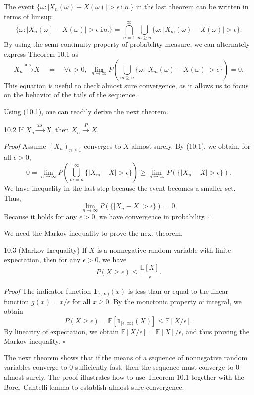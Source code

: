 The event $\{\omega:\lvert X_n(\omega)-X(\omega)\rvert>\epsilon\ \mathrm{i.o.}\}$ in the last theorem can be written in terms of limsup:
\[
\{\omega:\lvert X_n(\omega)-X(\omega)\rvert>\epsilon\ \mathrm{i.o.}\}
=
\bigcap_{n=1}^{\infty}\bigcup_{m\geq n}
\{\omega:\lvert X_m(\omega)-X(\omega)\rvert>\epsilon\}.
\]
By using the semi-continuity property of probability measure, we can alternately express Theorem 10.1 as
\[
X_n\xrightarrow{\mathrm{a.s.}}X
\quad\Longleftrightarrow\quad
\forall \epsilon>0,\;
\lim_{n\to\infty}P\left(
\bigcup_{m\geq n}
\{\omega:\lvert X_m(\omega)-X(\omega)\rvert>\epsilon\}
\right)=0.
\tag{10.1}
\]
This equation is useful to check almost sure convergence, as it allows us to focus on the behavior of the tails of the sequence.

Using (10.1), one can readily derive the next theorem.

\begin{thmbox}{10.2}
If $X_n\xrightarrow{\mathrm{a.s.}}X$, then $X_n\xrightarrow{P}X$.
\end{thmbox}

\textit{Proof}
Assume $(X_n)_{n\geq 1}$ converges to $X$ almost surely. By (10.1), we obtain, for all $\epsilon>0$,
\[
0=\lim_{n\to\infty}P\left(\bigcup_{m=n}^{\infty}\{\lvert X_m-X\rvert>\epsilon\}\right)
\geq
\lim_{n\to\infty}P(\{\lvert X_n-X\rvert>\epsilon\}).
\]
We have inequality in the last step because the event becomes a smaller set. Thus,
\[
\lim_{n\to\infty}P(\{\lvert X_n-X\rvert>\epsilon\})=0.
\]
Because it holds for any $\epsilon>0$, we have convergence in probability.
\hfill $\square$

We need the Markov inequality to prove the next theorem.

\begin{thmbox}{10.3 (Markov Inequality)}
If $X$ is a nonnegative random variable with finite expectation, then for any $\epsilon>0$, we have
\[
P(X\geq \epsilon)\leq \frac{\mathbb{E}[X]}{\epsilon}.
\]
\end{thmbox}

\textit{Proof}
The indicator function $\mathbf{1}_{[\epsilon,\infty)}(x)$ is less than or equal to the linear function $g(x)=x/\epsilon$ for all $x\geq 0$. By the monotonic property of integral, we obtain
\[
P(X\geq \epsilon)=\mathbb{E}[\mathbf{1}_{[\epsilon,\infty)}(X)]
\leq \mathbb{E}[X/\epsilon].
\]
By linearity of expectation, we obtain $\mathbb{E}[X/\epsilon]=\mathbb{E}[X]/\epsilon$, and thus proving the Markov inequality.
\hfill $\square$

The next theorem shows that if the means of a sequence of nonnegative random variables converge to $0$ sufficiently fast, then the sequence must converge to $0$ almost surely. The proof illustrates how to use Theorem 10.1 together with the Borel--Cantelli lemma to establish almost sure convergence.

